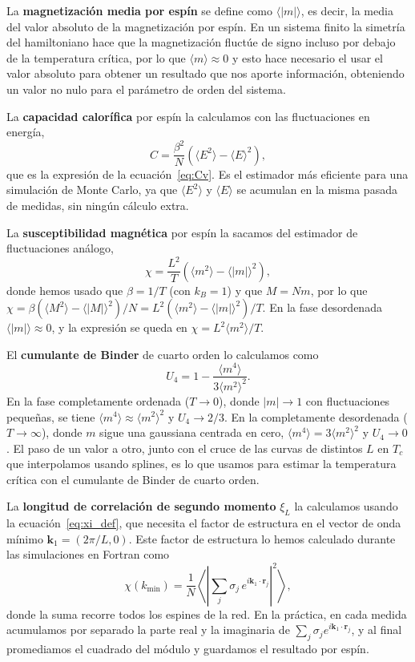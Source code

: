 La \textbf{magnetización media por espín} se define como $\langle |m| \rangle$, es decir, la media del valor absoluto de la magnetización por espín. En un sistema finito la simetría del hamiltoniano hace que la magnetización fluctúe de signo incluso por debajo de la temperatura crítica, por lo que $\langle m \rangle \approx 0$ y esto hace necesario el usar el valor absoluto para obtener un resultado que nos aporte información, obteniendo un valor no nulo para el parámetro de orden del sistema.

La \textbf{capacidad calorífica} por espín la calculamos con las fluctuaciones en energía,
\[
C = \frac{\beta^2}{N}\left(\langle E^2 \rangle - \langle E \rangle^2\right),
\]
que es la expresión de la ecuación~\eqref{eq:Cv}. Es el estimador más eficiente para una simulación de Monte Carlo, ya que $\langle E^2 \rangle$ y $\langle E \rangle$ se acumulan en la misma pasada de medidas, sin ningún cálculo extra.

La \textbf{susceptibilidad magnética} por espín la sacamos del estimador de fluctuaciones análogo,
\[
\chi = \frac{L^2}{T}\left(\langle m^2 \rangle - \langle |m| \rangle^2\right),
\]
donde hemos usado que $\beta = 1/T$ (con $k_B = 1$) y que $M = Nm$, por lo que $\chi = \beta(\langle M^2 \rangle - \langle |M| \rangle^2)/N = L^2(\langle m^2\rangle - \langle |m|\rangle^2)/T$. En la fase desordenada $\langle |m| \rangle \approx 0$, y la expresión se queda en $\chi = L^2 \langle m^2 \rangle / T$.

El \textbf{cumulante de Binder} de cuarto orden lo calculamos como
\[
U_4 = 1 - \frac{\langle m^4 \rangle}{3\langle m^2 \rangle^2}.
\]
En la fase completamente ordenada ($T \to 0$), donde $|m| \to 1$ con fluctuaciones pequeñas, se tiene $\langle m^4 \rangle \approx \langle m^2 \rangle^2$ y $U_4 \to 2/3$. En la completamente desordenada ($T \to \infty$), donde $m$ sigue una gaussiana centrada en cero, $\langle m^4 \rangle = 3\langle m^2 \rangle^2$ y $U_4 \to 0$. El paso de un valor a otro, junto con el cruce de las curvas de distintos $L$ en $T_c$ que interpolamos usando splines, es lo que usamos para estimar la temperatura crítica con el cumulante de Binder de cuarto orden.

La \textbf{longitud de correlación de segundo momento} $\xi_L$ la calculamos usando la ecuación~\eqref{eq:xi_def}, que necesita el factor de estructura en el vector de onda mínimo $\mathbf{k}_1 = (2\pi/L, 0)$. Este factor de estructura lo hemos calculado durante las simulaciones en Fortran como
\[
\chi(k_{\min}) = \frac{1}{N}\left\langle \left|\sum_j \sigma_j\, e^{i \mathbf{k}_1 \cdot \mathbf{r}_j}\right|^2 \right\rangle,
\]
donde la suma recorre todos los espines de la red. En la práctica, en cada medida acumulamos por separado la parte real y la imaginaria de $\sum_j \sigma_j e^{i\mathbf{k}_1\cdot\mathbf{r}_j}$, y al final promediamos el cuadrado del módulo y guardamos el resultado por espín.

